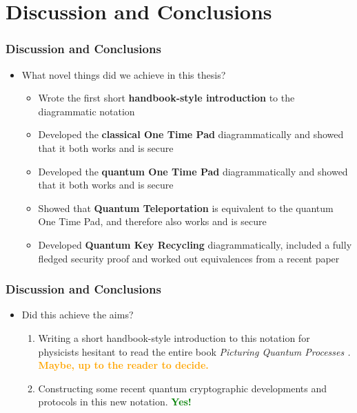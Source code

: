 \documentclass[]{beamer}
\begin{document}
\section{Discussion and Conclusions}
\begin{frame}
	\frametitle{Discussion and Conclusions}
	\begin{itemize}
		\item What novel things did we achieve in this thesis?\pause
		\begin{itemize}
			\item Wrote the first short \textbf{handbook-style introduction} to the diagrammatic notation\pause
			\item Developed the \textbf{classical One Time Pad} diagrammatically and showed that it both works and is secure\pause
			\item Developed the \textbf{quantum One Time Pad} diagrammatically and showed that it both works and is secure\pause
			\item Showed that \textbf{Quantum Teleportation} is equivalent to the quantum One Time Pad, and therefore also works and is secure\pause
			\item Developed \textbf{Quantum Key Recycling} diagrammatically, included a fully fledged security proof and worked out equivalences from a recent paper \cite{Leermakers2019}
		\end{itemize}
	\end{itemize}
\end{frame}

\begin{frame}
	\frametitle{Discussion and Conclusions}
	\begin{itemize}
		\item Did this achieve the aims?\pause
		\begin{enumerate}
			\item Writing a short handbook-style introduction to this notation for physicists hesitant to read the entire book \textit{Picturing Quantum Processes \cite{Coecke2017}.}\pause \newline
			\textcolor{orange}{\textbf{Maybe, up to the reader to decide.}}\pause
			\vspace{0.8cm}
			\item Constructing some recent quantum cryptographic developments and protocols in this new notation.\pause \newline
			\textcolor{green}{\textbf{Yes!}}
		\end{enumerate}
	\end{itemize}
\end{frame}
\end{document}
